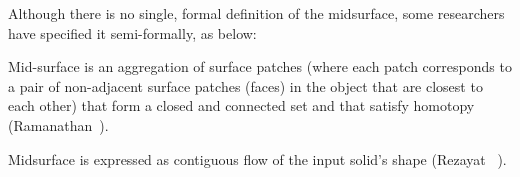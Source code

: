 Although there is no single, formal definition of the midsurface, some researchers have specified it semi-formally, as below:

\begin{mydef}\label{def:midsram}
Mid-surface is an aggregation of surface patches (where each patch corresponds to a pair of non-adjacent surface patches (faces) in the object that are closest to each other) that form a closed and connected set and that satisfy homotopy (Ramanathan~\cite{Ramanathan2004}).
\end{mydef}

\begin{mydef}\label{def:midsrez}
Midsurface is expressed as contiguous flow of the input solid's shape (Rezayat ~\cite{Rezayat1996}).
\end{mydef}

